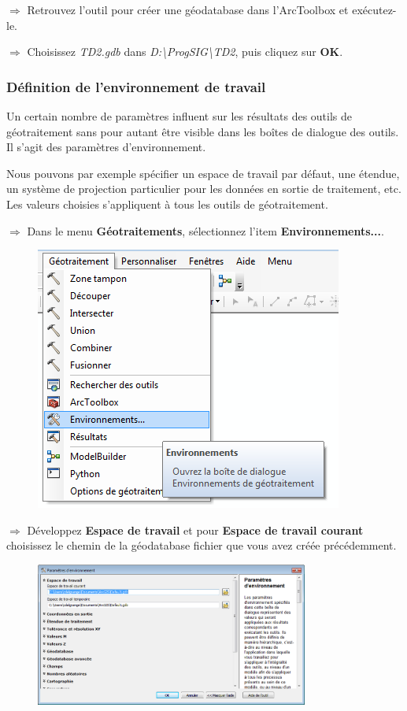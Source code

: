 \documentclass[11pt]{article}
\newcommand{\action}{$\Rightarrow$ }
\begin{document}
\action Retrouvez l'outil pour créer une géodatabase dans l'ArcToolbox et exécutez-le.

\action Choisissez \textit{TD2.gdb} dans \textit{D:\textbackslash{}ProgSIG\textbackslash{}TD2}, puis cliquez sur \textbf{OK}.


\subsubsection{Définition de l'environnement de travail}
Un certain nombre de paramètres influent sur les résultats des outils de géotraitement sans pour autant être visible dans les boîtes de dialogue des outils. Il s'agit des paramètres d'environnement.

Nous pouvons par exemple spécifier un espace de travail par défaut, une étendue, un système de projection particulier pour les données en sortie de traitement, etc. Les valeurs choisies s'appliquent à tous les outils de géotraitement.

\action Dans le menu \textbf{Géotraitements}, sélectionnez l'item \textbf{Environnements...}.
\begin{figure}[H]
	\center \includegraphics{img/td3/environnements_menu.png}\\
\end{figure}

\action Développez \textbf{Espace de travail} et pour \textbf{Espace de travail courant} choisissez le chemin de la géodatabase fichier que vous avez créée précédemment.
\begin{figure}[H]
	\center \includegraphics[width=0.8\textwidth]{img/td3/environnements_espace_travail.png}\\
\end{figure}
\end{document}
